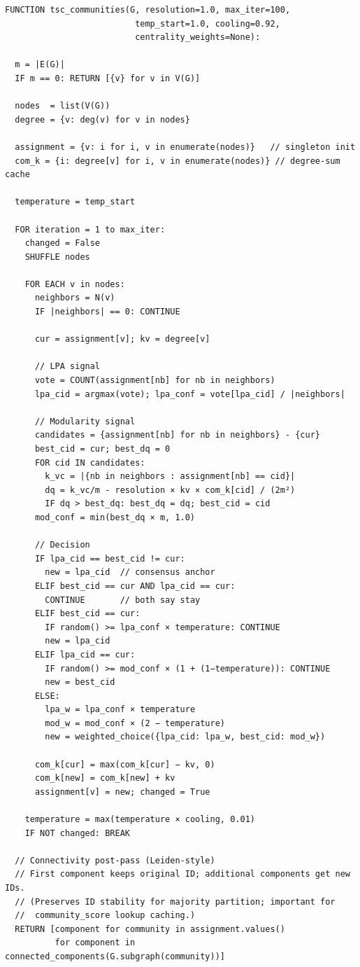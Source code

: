 \documentclass[10pt,journal,compsoc]{IEEEtran}
\begin{document}
\begin{lstlisting}
FUNCTION tsc_communities(G, resolution=1.0, max_iter=100,
                          temp_start=1.0, cooling=0.92,
                          centrality_weights=None):

  m = |E(G)|
  IF m == 0: RETURN [{v} for v in V(G)]

  nodes  = list(V(G))
  degree = {v: deg(v) for v in nodes}

  assignment = {v: i for i, v in enumerate(nodes)}   // singleton init
  com_k = {i: degree[v] for i, v in enumerate(nodes)} // degree-sum cache

  temperature = temp_start

  FOR iteration = 1 to max_iter:
    changed = False
    SHUFFLE nodes

    FOR EACH v in nodes:
      neighbors = N(v)
      IF |neighbors| == 0: CONTINUE

      cur = assignment[v]; kv = degree[v]

      // LPA signal
      vote = COUNT(assignment[nb] for nb in neighbors)
      lpa_cid = argmax(vote); lpa_conf = vote[lpa_cid] / |neighbors|

      // Modularity signal
      candidates = {assignment[nb] for nb in neighbors} - {cur}
      best_cid = cur; best_dq = 0
      FOR cid IN candidates:
        k_vc = |{nb in neighbors : assignment[nb] == cid}|
        dq = k_vc/m - resolution × kv × com_k[cid] / (2m²)
        IF dq > best_dq: best_dq = dq; best_cid = cid
      mod_conf = min(best_dq × m, 1.0)

      // Decision
      IF lpa_cid == best_cid != cur:
        new = lpa_cid  // consensus anchor
      ELIF best_cid == cur AND lpa_cid == cur:
        CONTINUE       // both say stay
      ELIF best_cid == cur:
        IF random() >= lpa_conf × temperature: CONTINUE
        new = lpa_cid
      ELIF lpa_cid == cur:
        IF random() >= mod_conf × (1 + (1−temperature)): CONTINUE
        new = best_cid
      ELSE:
        lpa_w = lpa_conf × temperature
        mod_w = mod_conf × (2 − temperature)
        new = weighted_choice({lpa_cid: lpa_w, best_cid: mod_w})

      com_k[cur] = max(com_k[cur] − kv, 0)
      com_k[new] = com_k[new] + kv
      assignment[v] = new; changed = True

    temperature = max(temperature × cooling, 0.01)
    IF NOT changed: BREAK

  // Connectivity post-pass (Leiden-style)
  // First component keeps original ID; additional components get new IDs.
  // (Preserves ID stability for majority partition; important for
  //  community_score lookup caching.)
  RETURN [component for community in assignment.values()
          for component in connected_components(G.subgraph(community))]
\end{lstlisting}
\end{document}
